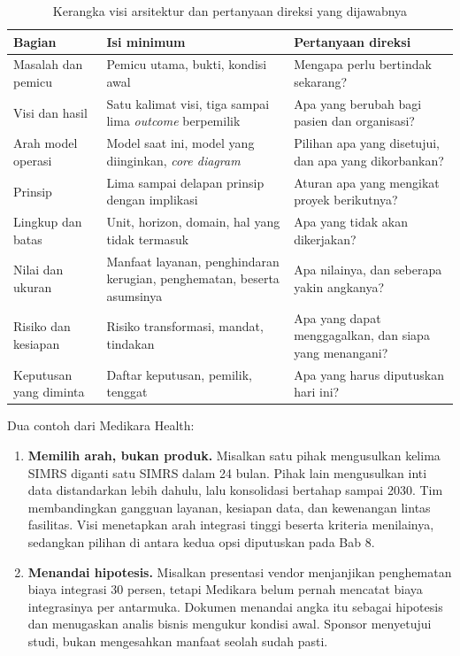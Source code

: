 \begin{table}[!htb]
  \centering
  \caption{Kerangka visi arsitektur dan pertanyaan direksi yang dijawabnya}
  \label{tab:ch03-kerangka-visi}
  \footnotesize
  \begin{tabularx}{\textwidth}{>{\raggedright\arraybackslash}p{2.3cm}*{2}{>{\raggedright\arraybackslash}X}}
    \hline
    \textbf{Bagian} & \textbf{Isi minimum} & \textbf{Pertanyaan direksi} \\
    \hline
    Masalah dan pemicu & Pemicu utama, bukti, kondisi awal & Mengapa perlu bertindak sekarang? \\
    \hline
    Visi dan hasil & Satu kalimat visi, tiga sampai lima \textit{outcome} berpemilik & Apa yang berubah bagi pasien dan organisasi? \\
    \hline
    Arah model operasi & Model saat ini, model yang diinginkan, \textit{core diagram} & Pilihan apa yang disetujui, dan apa yang dikorbankan? \\
    \hline
    Prinsip & Lima sampai delapan prinsip dengan implikasi & Aturan apa yang mengikat proyek berikutnya? \\
    \hline
    Lingkup dan batas & Unit, horizon, domain, hal yang tidak termasuk & Apa yang tidak akan dikerjakan? \\
    \hline
    Nilai dan ukuran & Manfaat layanan, penghindaran kerugian, penghematan, beserta asumsinya & Apa nilainya, dan seberapa yakin angkanya? \\
    \hline
    Risiko dan kesiapan & Risiko transformasi, mandat, tindakan & Apa yang dapat menggagalkan, dan siapa yang menangani? \\
    \hline
    Keputusan yang diminta & Daftar keputusan, pemilik, tenggat & Apa yang harus diputuskan hari ini? \\
    \hline
  \end{tabularx}
\end{table}

Dua contoh dari Medikara Health:

\begin{enumerate}
  \item \textbf{Memilih arah, bukan produk.} Misalkan satu pihak mengusulkan kelima
        SIMRS diganti satu SIMRS dalam 24 bulan. Pihak lain mengusulkan inti data
        distandarkan lebih dahulu, lalu konsolidasi bertahap sampai 2030. Tim
        membandingkan gangguan layanan, kesiapan data, dan kewenangan lintas
        fasilitas. Visi menetapkan arah integrasi tinggi beserta kriteria menilainya,
        sedangkan pilihan di antara kedua opsi diputuskan pada Bab 8.
  \item \textbf{Menandai hipotesis.} Misalkan presentasi vendor menjanjikan
        penghematan biaya integrasi 30 persen, tetapi Medikara belum pernah mencatat
        biaya integrasinya per antarmuka. Dokumen menandai angka itu sebagai
        hipotesis dan menugaskan analis bisnis mengukur kondisi awal. Sponsor
        menyetujui studi, bukan mengesahkan manfaat seolah sudah pasti.
\end{enumerate}

